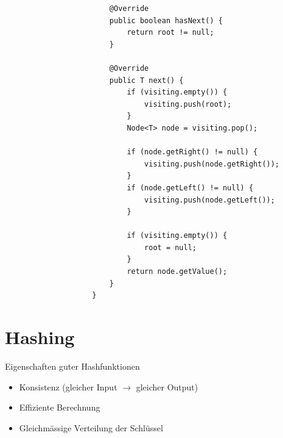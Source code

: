 \documentclass[a4paper, landscape, 8pt]{scrartcl}
\begin{document}
\begin{multicols*}{4}
\begin{lstlisting}
                        @Override
                        public boolean hasNext() {
                            return root != null;
                        }

                        @Override
                        public T next() {
                            if (visiting.empty()) {
                                visiting.push(root);
                            }
                            Node<T> node = visiting.pop();

                            if (node.getRight() != null) {
                                visiting.push(node.getRight());
                            }
                            if (node.getLeft() != null) {
                                visiting.push(node.getLeft());
                            }

                            if (visiting.empty()) {
                                root = null;
                            }
                            return node.getValue();
                        }
                    }
                    \end{lstlisting}


        \section{Hashing}
            \textcolor{subsectioncolor}{Eigenschaften guter Hashfunktionen}
            \begin{itemize}
                \item Konsistenz (gleicher Input $\to$ gleicher Output)
                \item Effiziente Berechnung
                \item Gleichmässige Verteilung der Schlüssel
            \end{itemize}


\end{multicols*}
\end{document}
